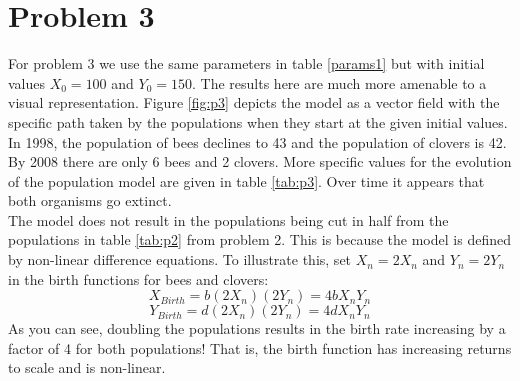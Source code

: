 \documentclass[12pt,a4paper,titlepage]{report}
\begin{document}
	\section*{Problem 3}
		For problem 3 we use the same parameters in table \ref{params1} but with initial values \(X_{0} = 100\) and \(Y_{0} = 150\). The results here are much more amenable to a visual representation. Figure \ref{fig:p3} depicts the model as a vector field with the specific path taken by the populations when they start at the given initial values.\\ 
		In 1998, the population of bees declines to 43 and the population of clovers is 42. By 2008 there are only 6 bees and 2 clovers. More specific values for the evolution of the population model are given in table \ref{tab:p3}. Over time it appears that both organisms go extinct. \\
		The model does not result in the populations being cut in half from the populations in table \ref{tab:p2} from problem 2. This is because the model is defined by non-linear difference equations. To illustrate this, set \(X_{n} = 2X_{n}\) and \(Y_{n} = 2Y_{n}\) in the birth functions for bees and clovers:
		\[X_{Birth} = b (2X_{n})(2Y_{n}) = 4bX_{n}Y_{n}\]
		\[Y_{Birth} = d (2X_{n})(2Y_{n}) = 4dX_{n}Y_{n}\]
		As you can see,  doubling the populations results in the birth rate increasing by a factor of 4 for both populations! That is, the birth function has increasing returns to scale and is non-linear. \\
		
\end{document}
